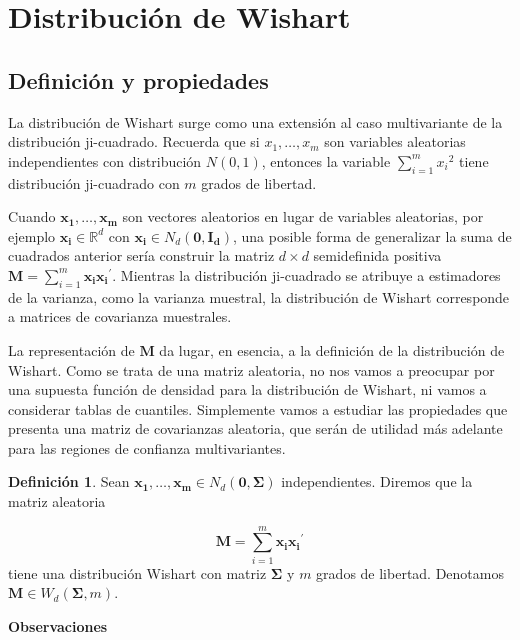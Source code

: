 \documentclass[
  a4paper,
  oneside]{scrbook}
\theoremstyle{definition}
\newtheorem{definition}{Definición}[chapter]
\theoremstyle{definition}
\theoremstyle{definition}
\theoremstyle{definition}
\theoremstyle{remark}
\begin{document}
\section{Distribución de Wishart}\label{distribucion-de-wishart}

\subsection{Definición y propiedades}\label{definicion-y-propiedades}

La distribución de Wishart surge como una extensión al caso
multivariante de la distribución ji-cuadrado. Recuerda que si
\(x_1,\ldots, x_m\) son variables aleatorias independientes con
distribución \(N(0,1)\), entonces la variable \(\sum_{i=1}^m{{x_i}^2}\)
tiene distribución ji-cuadrado con \(m\) grados de libertad.

Cuando \(\bm{x_1},\ldots, \bm{x_m}\) son vectores aleatorios en lugar de
variables aleatorias, por ejemplo \(\bm{x_i}\in\mathbb{R}^d\) con
\(\bm{x_i}\in N_d(\bm{0},\bm{I_d})\), una posible forma de generalizar la
suma de cuadrados anterior sería construir la matriz \(d\times d\)
semidefinida positiva \(\bm{M}=\sum_{i=1}^m\bm{x_i}\bm{x_i}^{\prime}\).
Mientras la distribución ji-cuadrado se atribuye a estimadores de la
varianza, como la varianza muestral, la distribución de Wishart
corresponde a matrices de covarianza muestrales.

La representación de \(\bm{M}\) da lugar, en esencia, a la definición de
la distribución de Wishart. Como se trata de una matriz aleatoria, no
nos vamos a preocupar por una supuesta función de densidad para la
distribución de Wishart, ni vamos a considerar tablas de cuantiles.
Simplemente vamos a estudiar las propiedades que presenta una matriz de
covarianzas aleatoria, que serán de utilidad más adelante para las
regiones de confianza multivariantes.

\begin{definition}
\protect\hypertarget{def:unnamed-chunk-97}{}\label{def:unnamed-chunk-97}Sean \(\bm{x_1},\ldots,\bm{x_m}\in N_d(\bm{0},\bm\Sigma)\) independientes.
Diremos que la matriz aleatoria

\[\bm{M}=\sum_{i=1}^m \bm{x_i} \bm{x_i}^{\prime}\] tiene una
distribución Wishart con matriz \(\bm\Sigma\) y \(m\) grados de libertad.
Denotamos \(\bm{M}\in W_d(\bm\Sigma,m)\).
\end{definition}

\textbf{Observaciones}
\end{document}
